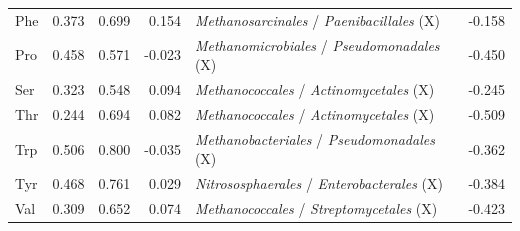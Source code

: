 \begin{table}[!ht]
\begin{tabular}{lrrrlr}
  Phe & 0.373 & 0.699 & 0.154 & \textit{Methanosarcinales} / \textit{Paenibacillales} (X) & -0.158 \\
  Pro & 0.458 & 0.571 & -0.023 & \textit{Methanomicrobiales} / \textit{Pseudomonadales} (X) & -0.450 \\
  Ser & 0.323 & 0.548 & 0.094 & \textit{Methanococcales} / \textit{Actinomycetales} (X) & -0.245 \\
  Thr & 0.244 & 0.694 & 0.082 & \textit{Methanococcales} / \textit{Actinomycetales} (X) & -0.509 \\
  Trp & 0.506 & 0.800 & -0.035 & \textit{Methanobacteriales} / \textit{Pseudomonadales} (X) & -0.362 \\
  Tyr & 0.468 & 0.761 & 0.029 & \textit{Nitrososphaerales} / \textit{Enterobacterales} (X) & -0.384 \\
  Val & 0.309 & 0.652 & 0.074 & \textit{Methanococcales} / \textit{Streptomycetales} (X) & -0.423 \\
\bottomrule
\end{tabular}
\end{table}


